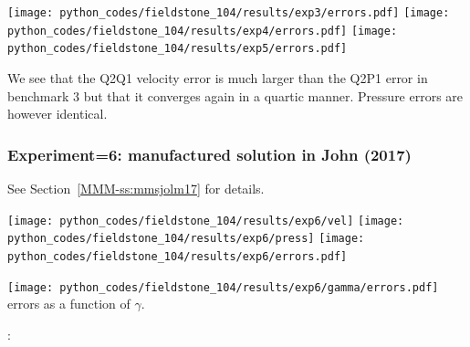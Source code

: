\begin{center}
\texttt{[image: python\_codes/fieldstone\_104/results/exp3/errors.pdf]}
\texttt{[image: python\_codes/fieldstone\_104/results/exp4/errors.pdf]}
\texttt{[image: python\_codes/fieldstone\_104/results/exp5/errors.pdf]}
\end{center}

We see that the Q2Q1 velocity error is much larger than the Q2P1 error in benchmark 3 
but that it converges again in a quartic manner.
Pressure errors are however identical.

\subsubsection*{Experiment=6: manufactured solution in John \etal (2017) \cite{jolm17}}

See Section~\ref{MMM-ss:mmsjolm17} for details.

\begin{center}
\texttt{[image: python\_codes/fieldstone\_104/results/exp6/vel]}
\texttt{[image: python\_codes/fieldstone\_104/results/exp6/press]}
\texttt{[image: python\_codes/fieldstone\_104/results/exp6/errors.pdf]}
\end{center}


\begin{center}
\texttt{[image: python\_codes/fieldstone\_104/results/exp6/gamma/errors.pdf]}\\
{\captionfont errors as a function of $\gamma$.}
\end{center}

\vspace{2cm}

\Literature: 
\textcite{hera13}



